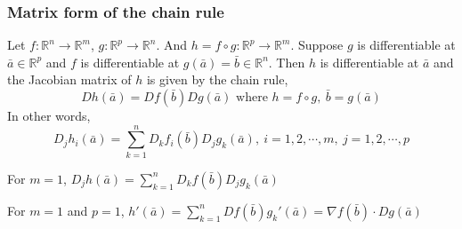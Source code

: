 \subsubsection{Matrix form of the chain rule}
Let $f : \mathbb{R}^n \to \mathbb{R}^m$, $g : \mathbb{R}^p \to \mathbb{R}^n$.
And $h = f \circ g : \mathbb{R}^p \to \mathbb{R}^m$.
Suppose $g$ is differentiable at $\bar{a} \in \mathbb{R}^p$ and $f$ is differentiable at $g(\bar{a}) = \bar{b} \in \mathbb{R}^n$.
Then $h$ is differentiable at $\bar{a}$ and the Jacobian matrix of $h$ is given by the chain rule,
\[ Dh(\bar{a}) = Df(\bar{b})Dg(\bar{a}) \text{ where } h = f \circ g,\ \bar{b} = g(\bar{a})\]
In other words,
\[ D_jh_i(\bar{a}) = \sum_{k=1}^n D_k f_i(\bar{b}) D_j g_k(\bar{a}),\ i=1,2,\cdots,m,\ j=1,2,\cdots,p \]

For $m=1$, $D_j h(\bar{a}) = \sum_{k=1}^n D_kf(\bar{b}) D_jg_k(\bar{a})$

For $m=1$ and $p=1$, $h'(\bar{a}) = \sum_{k=1}^n Df(\bar{b}) g_k'(\bar{a}) = \nabla f(\bar{b}) \cdot Dg(\bar{a})$

